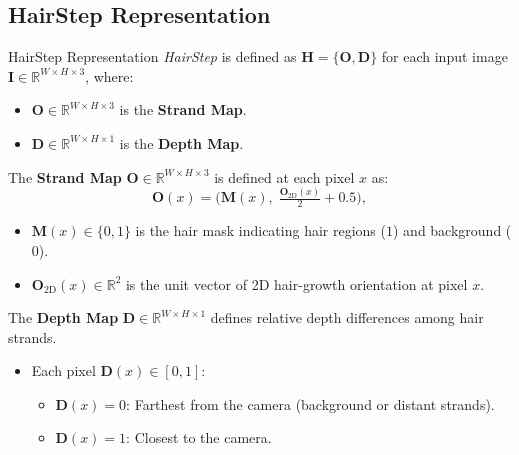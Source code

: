 
\subsection{HairStep Representation}
\begin{frame}[t]{HairStep Representation}
    \emph{HairStep} is defined as $\mathbf{H} = \{\mathbf{O}, \mathbf{D}\}$ for each input image $\mathbf{I} \in \mathbb{R}^{W \times H \times 3}$, where:
    \begin{itemize}
        \item $\mathbf{O} \in \mathbb{R}^{W \times H \times 3}$ is the \textbf{Strand Map}.
        \item $\mathbf{D} \in \mathbb{R}^{W \times H \times 1}$ is the \textbf{Depth Map}.
    \end{itemize}

    \vspace{2pt}

    The \textbf{Strand Map} $\mathbf{O} \in \mathbb{R}^{W \times H \times 3}$ is defined at each pixel $x$ as:
    \begin{equation}
        \mathbf{O}(x) = \bigl(\mathbf{M}(x),\; \tfrac{\mathbf{O}_{\mathrm{2D}}(x)}{2} + 0.5\bigr),
        \label{eq:strand_map}
    \end{equation}
    \vspace{-0.5cm}
    \begin{itemize}
        \item $\mathbf{M}(x) \in \{0, 1\}$ is the hair mask indicating hair regions ($1$) and background ($0$).
        \item $\mathbf{O}_{\mathrm{2D}}(x) \in \mathbb{R}^2$ is the unit vector of 2D hair-growth orientation at pixel $x$.
    \end{itemize}

    \vspace{2pt}

    The \textbf{Depth Map} $\mathbf{D} \in \mathbb{R}^{W \times H \times 1}$ defines relative depth differences among hair strands.

    \vspace{5pt}
    \begin{itemize}
        \item Each pixel $\mathbf{D}(x) \in [0, 1]$:
        \begin{itemize}
            \item $\mathbf{D}(x) = 0$: Farthest from the camera (background or distant strands).
            \item $\mathbf{D}(x) = 1$: Closest to the camera.
        \end{itemize}
    \end{itemize}
\end{frame}

